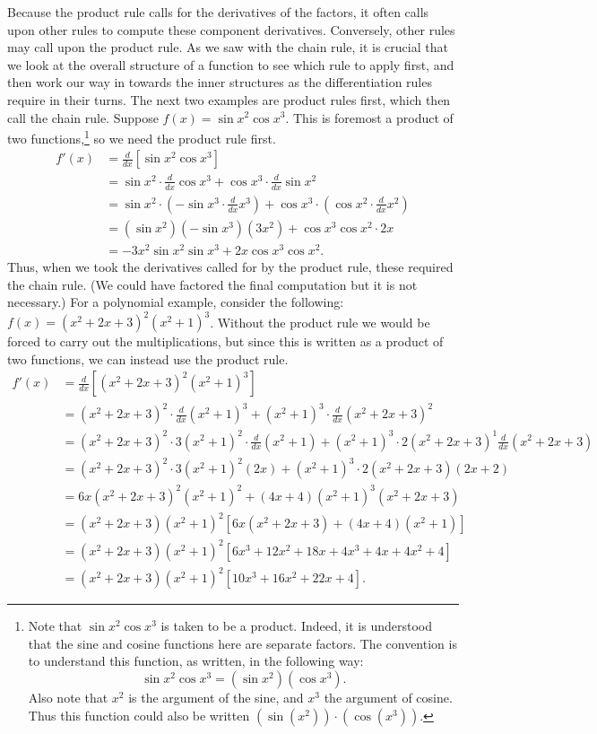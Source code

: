 Because the product rule calls for the derivatives of 
the factors, it often calls upon other rules to compute
these component derivatives.  Conversely, other rules
may call upon the product rule.
As we saw with the chain rule, it is crucial that we
look at the overall structure of a function to see
which rule to apply first, and then work our way in 
towards the inner structures as the differentiation rules
require in their turns.  The next two examples are product rules
first, which then call the chain rule.
\bex Suppose $f(x)=\sin x^2\cos x^3.$  This is foremost
     a product of two functions,\footnote{%
Note that $\sin x^2\cos x^3$ is taken to be a
product.  Indeed, it is understood that
the sine and cosine functions here are separate factors.  The convention is to
understand this function, as written, in the following way:
$$\sin x^2\cos x^3=(\sin x^2)(\cos x^3).$$
Also note that $x^2$ is the argument of the sine, and $x^3$ the
argument of cosine.  Thus this function could also be written
$(\sin(x^2))\cdot(\cos(x^3))$.
} so we need the product rule first.
\begin{align*}
f'(x)&=\frac{d}{dx}\left[\sin x^2\cos x^3\right]\\
     &=\sin x^2\cdot\frac{d}{dx}\cos x^3+\cos x^3\cdot\frac{d}{dx}\sin x^2\\
     &=\sin x^2\cdot\left(-\sin x^3\cdot\frac{d}{dx}x^3\right)
       +\cos x^3\cdot\left(\cos x^2\cdot\frac{d}{dx}x^2\right)\\
     &=(\sin x^2)(-\sin x^3)(3x^2)+\cos x^3\cos x^2\cdot2x\\
     &=-3x^2\sin x^2\sin x^3+2x\cos x^3\cos x^2.
\end{align*}
Thus, when we took the derivatives called for by the product rule, these
required the chain rule.
(We could have factored the final computation but it is not necessary.)
\eex
For a polynomial example, consider the following:
\bex $f(x)=(x^2+2x+3)^2(x^2+1)^3$.  Without the product
rule we would be forced to carry out the multiplications,
but since this is written as
a product of two functions, we can instead use the product rule.
\begin{align*}
f'(x)&=\frac{d}{dx}\left[(x^2+2x+3)^2(x^2+1)^3\right]\\
     &=(x^2+2x+3)^2\cdot\frac{d}{dx}(x^2+1)^3+(x^2+1)^3\cdot
            \frac{d}{dx}(x^2+2x+3)^2\\
     &=(x^2+2x+3)^2\cdot3(x^2+1)^2\cdot\frac{d}{dx}(x^2+1)
      +(x^2+1)^3\cdot2(x^2+2x+3)^1\frac{d}{dx}(x^2+2x+3)\\
     &=(x^2+2x+3)^2\cdot3(x^2+1)^2(2x)+(x^2+1)^3\cdot2(x^2+2x+3)(2x+2)\\
     &=6x(x^2+2x+3)^2(x^2+1)^2+(4x+4)(x^2+1)^3(x^2+2x+3)\\
     &=(x^2+2x+3)(x^2+1)^2\left[6x(x^2+2x+3)+(4x+4)(x^2+1)\right]\\
     &=(x^2+2x+3)(x^2+1)^2\left[6x^3+12x^2+18x+4x^3+4x+4x^2+4\right]\\
     &=(x^2+2x+3)(x^2+1)^2\left[10x^3+16x^2+22x+4\right].
\end{align*}
